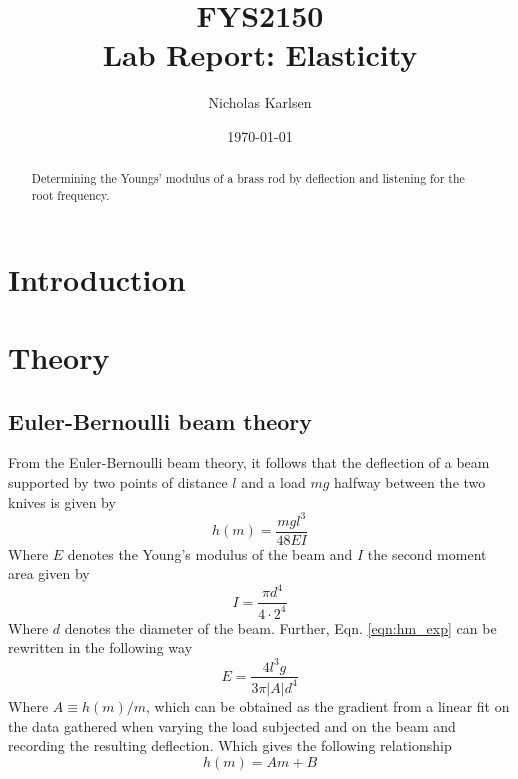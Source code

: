 \documentclass[11pt,a4paper]{article}
\begin{document}

\title{FYS2150 \\ Lab Report: Elasticity}%

\author{Nicholas Karlsen}

\date{\today}%

\maketitle

\begin{abstract}
Determining the Youngs' modulus of a brass rod by deflection and listening for the root frequency.
\end{abstract}


\section{\label{sect:intro}Introduction}
    
\section{\label{sect:theory}Theory}
  \subsection{Euler-Bernoulli beam theory}
  From the Euler-Bernoulli beam theory, it follows that the deflection of a beam supported by two points of distance $l$ and a load $mg$ halfway between the two knives is given by
  \begin{equation}
    h(m) = \frac{mgl^3}{48EI}
    \label{eqn:hm_exp}
  \end{equation}
  Where $E$ denotes the Young's modulus of the beam and $I$ the second moment area given by 
  \begin{equation}
    I = \frac{\pi d^4}{4\cdot 2^4}
  \end{equation}
  Where $d$ denotes the diameter of the beam.
  \newline
  Further, Eqn. \ref{eqn:hm_exp} can be rewritten in the following way
  \begin{equation}
    E = \frac{4l^3g}{3\pi |A|d^4}
  \end{equation}
  Where $A \equiv h(m)/m$, which can be obtained as the gradient from a linear fit on the data gathered when varying the load subjected and on the beam and recording the resulting deflection. Which gives the following relationship
  \begin{equation}
    h(m) = Am + B
  \end{equation}
\end{document}
